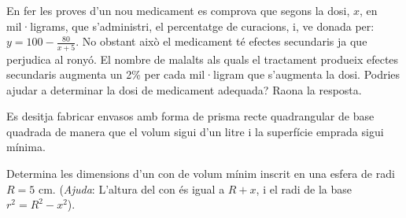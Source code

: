 \begin{mylist}
	\exer En fer les proves d'un nou medicament es comprova que segons la dosi, $x$, en mil·ligrams, que s'administri, el percentatge de curacions, i, ve donada per: $y = 100 - \frac{80}{x + 5}$. No obstant això el medicament té efectes secundaris ja que perjudica al ronyó. El nombre de malalts als quals el tractament produeix efectes secundaris augmenta un 2\% per cada mil·ligram que s'augmenta la dosi. Podries ajudar a determinar la dosi de medicament adequada? Raona la resposta.
	
	
	
	\exer  Es desitja fabricar envasos amb forma de prisma recte quadrangular de base quadrada de manera que el volum sigui d'un litre i la superfície emprada sigui mínima. 
	
	
	
	\exer  Determina les dimensions d'un con de volum mínim inscrit en una esfera de radi $R = 5$ cm. (\textit{Ajuda}: L'altura del con és igual a $R + x$, i el radi de la base $r^2 = R^2 - x^2$).
	
	

	

\end{mylist}
